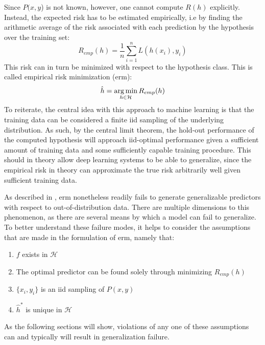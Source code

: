 		Since \(P(x,y\)) is not known, however, one cannot compute \(R(h)\) explicitly. Instead, the expected risk has to be estimated empirically, i.e by finding the arithmetic average of the risk associated with each prediction by the hypothesis over the training set:
		\begin{equation}
		R_{emp}(h) = \frac{1}{n}\sum_{i=1}^{n}L(h(x_i), y_i)
		\end{equation}
		This risk can in turn be minimized with respect to the hypothesis class. This is called empirical risk minimization (\gls{erm}):
		\begin{equation}
		\hat{h} = \operatorname*{arg\,min}_{h \in \mathcal{H}}R_{emp}(h)
		\end{equation}
		To reiterate, the central idea with this approach to machine learning is that the training data can be considered a finite \gls{iid} sampling of the underlying distribution. As such, by the central limit theorem, the hold-out performance of the computed hypothesis will approach \gls{iid}-optimal performance given a sufficient amount of training data and some sufficiently capable training procedure. This should in theory allow deep learning systems to be able to generalize, since the empirical risk in theory can approximate the true risk arbitrarily well given sufficient training data.

		As described in , \gls{erm} nonetheless readily fails to generate generalizable predictors with respect to out-of-distribution data. There are multiple dimensions to this phenomenon, as there are several means by which a model can fail to generalize. To better understand these failure modes, it helps to consider the assumptions that are made in the formulation of \gls{erm}, namely that:
		\begin{enumerate}
			\item \(f\) exists in \(\mathcal{H}\) \label{underfit}
			\item The optimal predictor can be found solely through minimizing \(R_{emp}(h)\)\label{overfit}
			\item \(\{x_i, y_i\}\) is an \gls{iid} sampling of \(P(x,y)\) \label{structural_misalignment}
			\item \(\hat{h}^*\) is unique in \(\mathcal{H}\)\label{underspecification}
		\end{enumerate}
		As the following sections will show, violations of any one of these assumptions can and typically will result in generalization failure. 

